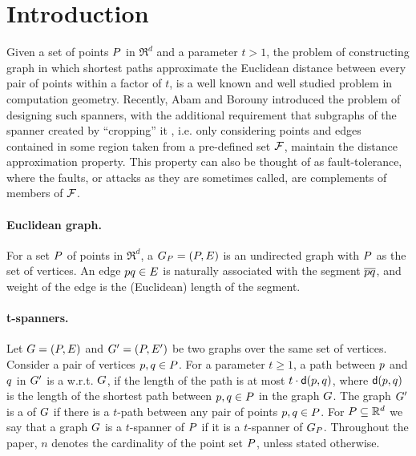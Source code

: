 \documentclass[12pt]{article}%
\begin{document}

\section{Introduction}

Given a set of points $P$ in $\Re^d$ and a parameter $t>1$, the
problem of constructing graph in which shortest paths approximate the
Euclidean distance between every pair of points within a factor of
$t$, is a well known and well studied problem in computation
geometry. Recently, Abam and Borouny \cite{ab-lgs-21} introduced the
problem of designing such spanners, with the additional requirement
that subgraphs of the spanner created by ``cropping'' it , i.e. only
considering points and edges contained in some region taken from a
pre-defined set $\mathcal{F}$, maintain the distance approximation
property. This property can also be thought of as fault-tolerance,
where the faults, or attacks as they are sometimes called, are
complements of members of $\mathcal{F}$.


\paragraph{Euclidean graph.}
For a set $P$ of points in $\Re^d$, a 
$G_P = (P, E)$ is an undirected graph with $P$ as the set of
vertices. An edge $p q \in E$ is naturally associated with the
segment $\overline{pq}$, and weight of the edge is the (Euclidean)
length of the segment.


\paragraph{t-spanners.}
Let $G=(P,E)$ and $G'=(P,E')$ be two graphs over the same
set of vertices. Consider a pair of vertices $p,q \in P$. For a
parameter $t \geq 1$, a path between $p$ and $q$ in $G'$ is a
 w.r.t. $G$, if the length of the path is at most
$t \cdot \dGY{\pa}{\pb}$, where $\dGY{\pa}{\pb}$ is the length of the
shortest path between $p,q\in P$ in the graph $G$.  The graph
$G'$ is a  of $G$ if there is a $t$-path between
any pair of points $p,q\in P$.  For $P\subseteq \mathbb{R}^d$ we say
that a graph $G$ is a $t$-spanner of $P$ if it is a $t$-spanner of
$G_P$. Throughout the paper, $n$ denotes the cardinality of the
point set $P$, unless stated otherwise.
\end{document}
